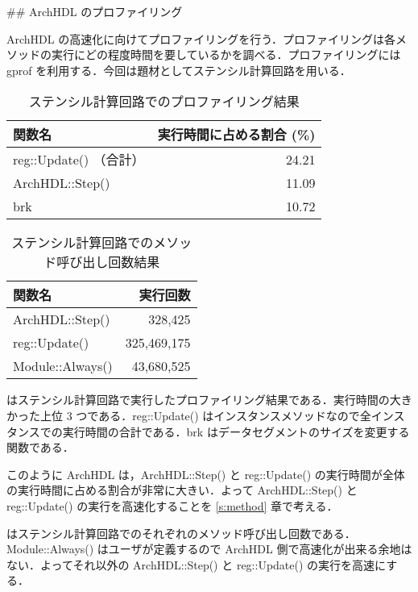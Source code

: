 ## ArchHDL のプロファイリング \label{ss:profiling}

ArchHDL の高速化に向けてプロファイリングを行う．プロファイリングは各メソッドの実行にどの程度時間を要しているかを調べる．プロファイリングには
gprof \cite{gprof}を利用する．今回は題材としてステンシル計算回路を用いる．

\begin{table}[t]
 \caption{ステンシル計算回路でのプロファイリング結果}
 \label{table:stencil_prof}
 \begin{center}
  \begin{tabular}{lr} \toprule
  関数名 & 実行時間に占める割合 (\%) \\ \midrule
  reg::Update() （合計） & 24.21 \\
  ArchHDL::Step() & 11.09 \\
  brk & 10.72 \\ \bottomrule
  \end{tabular}
 \end{center}
\end{table}

\begin{table}[t]
 \caption{ステンシル計算回路でのメソッド呼び出し回数結果}
 \label{table:stencil_method_call_count}
 \begin{center}
  \begin{tabular}{lr} \toprule
  関数名 & 実行回数 \\ \midrule
  ArchHDL::Step()   &     328,425 \\
  reg::Update()     & 325,469,175 \\
  Module::Always()  &  43,680,525 \\ \bottomrule
  \end{tabular}
 \end{center}
\end{table}


 はステンシル計算回路で実行したプロファイリング結果である．実行時間の大きかった上位 3 つである．reg::Update() はインスタンスメソッドなので全インスタンスでの実行時間の合計である．brk はデータセグメントのサイズを変更する関数である．

このように ArchHDL は，ArchHDL::Step() と reg::Update() の実行時間が全体の実行時間に占める割合が非常に大きい．よって ArchHDL::Step() と reg::Update() の実行を高速化することを \ref{s:method} 章で考える．

 はステンシル計算回路でのそれぞれのメソッド呼び出し回数である．Module::Always() はユーザが定義するので ArchHDL 側で高速化が出来る余地はない．よってそれ以外の ArchHDL::Step() と reg::Update() の実行を高速にする．



